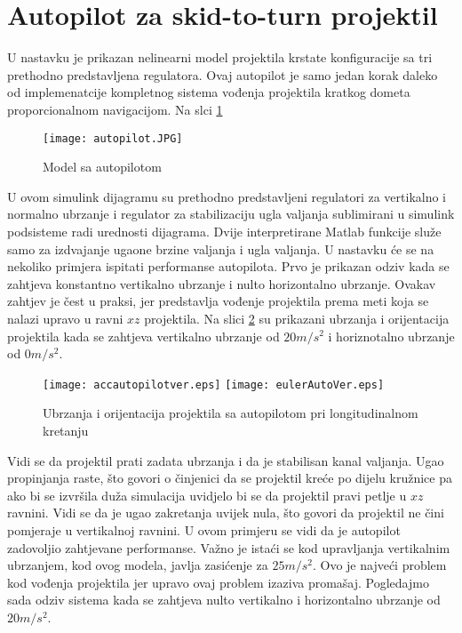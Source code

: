 \section{Autopilot za skid-to-turn projektil}
U nastavku je prikazan nelinearni model projektila krstate konfiguracije sa tri 
prethodno predstavljena regulatora. Ovaj autopilot je samo jedan korak daleko od
implemenatcije kompletnog sistema vođenja projektila kratkog dometa proporcionalnom
navigacijom. Na slci \ref{fig:autopilot3}
\begin{figure}[!ht]
    \centering
    \texttt{[image: autopilot.JPG]}
    \caption{Model sa autopilotom}
    \label{fig:autopilot3}
\end{figure}
U ovom simulink dijagramu su prethodno predstavljeni regulatori za vertikalno i normalno ubrzanje i 
regulator za stabilizaciju ugla valjanja sublimirani u simulink podsisteme radi 
urednosti dijagrama. Dvije interpretirane Matlab funkcije služe samo za izdvajanje ugaone brzine valjanja
i ugla valjanja. U nastavku će se na nekoliko primjera ispitati performanse 
autopilota. Prvo je prikazan odziv kada se zahtjeva konstantno vertikalno ubrzanje i nulto 
horizontalno ubrzanje. Ovakav zahtjev je čest u praksi, jer predstavlja vođenje projektila 
prema meti koja se nalazi upravo u ravni $xz$ projektila. Na slici \ref{fig:accautover} su prikazani 
ubrzanja i orijentacija projektila kada se zahtjeva vertikalno ubrzanje od $20 m/s^2$ i horiznotalno ubrzanje od 
$0m/s^2$.
\begin{figure}[!ht]
    \centering
    \texttt{[image: accautopilotver.eps]}
    \texttt{[image: eulerAutoVer.eps]}
    \caption{Ubrzanja i orijentacija projektila sa autopilotom pri longitudinalnom kretanju}
    \label{fig:accautover}
\end{figure}
Vidi se da projektil prati zadata ubrzanja i da je stabilisan kanal valjanja. Ugao propinjanja raste, 
što govori o činjenici da se projektil kreće po dijelu kružnice pa ako bi se izvršila duža simulacija 
uvidjelo bi se da projektil pravi petlje u $xz$ ravnini. Vidi se da je ugao zakretanja 
uvijek nula, što govori da projektil ne čini pomjeraje u vertikalnoj ravnini. U ovom primjeru se 
vidi da je autopilot zadovoljio zahtjevane performanse. Važno je istaći se kod upravljanja vertikalnim 
ubrzanjem, kod ovog modela, javlja zasićenje za $25m/s^2$. Ovo je najveći problem 
kod vođenja projektila jer upravo ovaj problem izaziva promašaj. 
Pogledajmo sada odziv sistema kada se zahtjeva nulto vertikalno i horizontalno ubrzanje od $20m/s^2$. 
